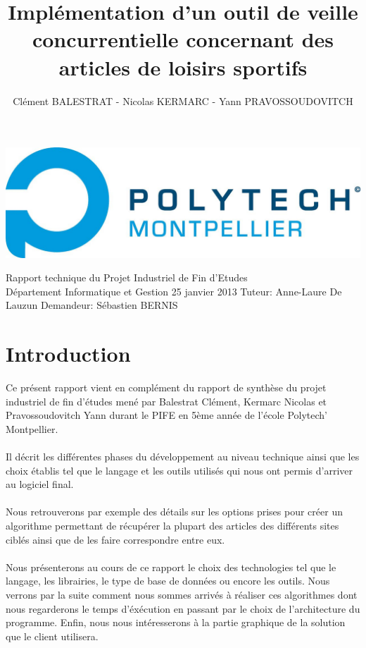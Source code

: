 \documentclass{report}
\title{\LARGE Implémentation d'un outil de veille concurrentielle concernant des articles de loisirs sportifs}      %
\author{Clément BALESTRAT - Nicolas KERMARC - Yann PRAVOSSOUDOVITCH}
\makeatletter
\def\thetitle{\@title}
\def\theauthor{\large\@author}
\makeatother
\begin{document}
\begin{titlepage}

\includegraphics[scale=0.1]{logo.jpg} 

\centering
\vfill
{\Huge\bfseries \thetitle}
\vskip 1cm
{\Large \theauthor}
\hspace{10.5cm}
\vskip 0.25cm
\Large Rapport technique du Projet Industriel de Fin d'Etudes\\
\Large Département Informatique et Gestion
\vskip 0.25cm
\Large 25 janvier 2013
\vskip 0.5cm
\vfill
\large Tuteur: Anne-Laure De Lauzun
\hspace{2cm}
\large Demandeur: Sébastien BERNIS
\end{titlepage}



\renewcommand{\contentsname}{Sommaire}
 


\tableofcontents

\chapter{Introduction}
Ce présent rapport vient en complément du rapport de synthèse du projet industriel de fin d'études mené par Balestrat Clément, Kermarc Nicolas et Pravossoudovitch Yann durant le PIFE en 5ème année de l'école Polytech' Montpellier.\\\\
Il décrit les différentes phases du développement au niveau technique ainsi que les choix établis tel que le langage et les outils utilisés qui nous ont permis d'arriver au logiciel final.\\\\
Nous retrouverons par exemple des détails sur les options prises pour créer un algorithme permettant de récupérer la plupart des articles des différents sites ciblés ainsi que de les faire correspondre entre eux.\\\\
Nous présenterons au cours de ce rapport le choix des technologies tel que le langage, les librairies, le type de base de données ou encore les outils. Nous verrons par la suite comment nous sommes arrivés à réaliser ces algorithmes dont nous regarderons le temps d'éxécution en passant par le choix de l'architecture du programme. Enfin, nous nous intéresserons à la partie graphique de la solution que le client utilisera.
\end{document}
